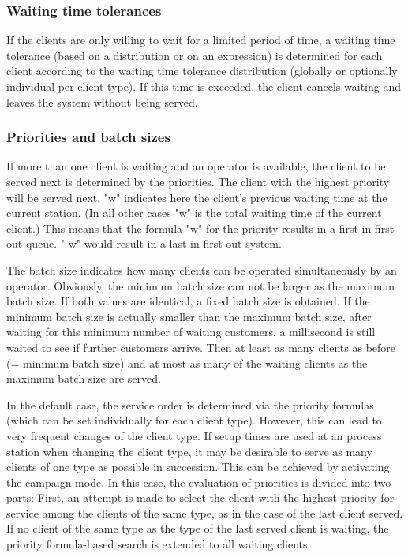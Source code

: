 \subsubsection*{Waiting time tolerances}

If the clients are only willing to wait for a limited period of time, a waiting time tolerance (based on a distribution
or on an expression) is determined for each client according to the waiting time tolerance distribution
(globally or optionally individual per client type). If this time is exceeded, the client cancels waiting and leaves
the system without being served.

\subsubsection*{Priorities and batch sizes}

If more than one client is waiting and an operator is available, the client to be served next is determined by the 
priorities. The client with the highest priority will be served next. 
"w" indicates here the client's previous waiting time at the current station. (In all other cases "w" is the total
waiting time of the current client.) This means that the formula "w" for the priority results
in a first-in-first-out queue. "-w" would result in a last-in-first-out system.

The batch size indicates how many clients can be operated simultaneously by an operator. Obviously, the minimum batch
size can not be larger as the maximum batch size. If both values are identical, a fixed batch size is obtained.
If the minimum batch size is actually smaller than the maximum batch size, after waiting for this minimum number of
waiting customers, a millisecond is still waited to see if further customers arrive. Then at least as many clients
as before (= minimum batch size) and at most as many of the waiting clients as the maximum batch size are served.

In the default case, the service order is determined via the priority formulas (which can be set individually for each client type).
However, this can lead to very frequent changes of the client type. If setup times are used at an process station when changing the
client type, it may be desirable to serve as many clients of one type as possible in succession. This can be achieved by activating
the campaign mode. In this case, the evaluation of priorities is divided into two parts: First, an attempt is made to select the
client with the highest priority for service among the clients of the same type, as in the case of the last client served.
If no client of the same type as the type of the last served client is waiting, the priority formula-based search is extended
to all waiting clients.


